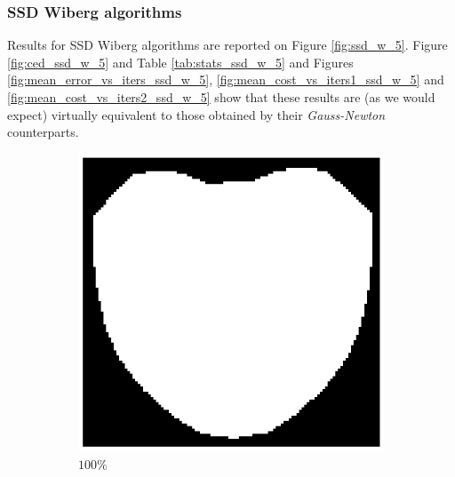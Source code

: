 \subsubsection{SSD Wiberg algorithms}

Results for SSD Wiberg algorithms are reported on Figure \ref{fig:ssd_w_5}. Figure \ref{fig:ced_ssd_w_5} and Table \ref{tab:stats_ssd_w_5} and Figures \ref{fig:mean_error_vs_iters_ssd_w_5}, \ref{fig:mean_cost_vs_iters1_ssd_w_5} and \ref{fig:mean_cost_vs_iters2_ssd_w_5} show that these results are (as we would expect) virtually equivalent to those obtained by their \emph{Gauss-Newton} counterparts.

\begin{figure}[t!]
	\centering
	\begin{subfigure}{0.16\textwidth}
		\includegraphics[width=\textwidth]{figures/sampling_100.png}
		\caption{$100\%$}
		\label{fig:sampling_100}
	\end{subfigure}
	\begin{subfigure}{0.16\textwidth}

\end{subfigure}
\end{figure}
